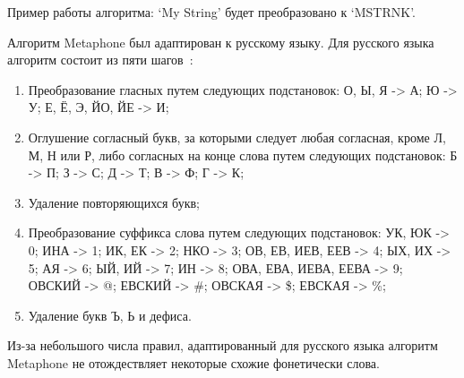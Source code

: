 Пример работы алгоритма: `My String' будет преобразовано к `MSTRNK'.

Алгоритм Metaphone был адаптирован к русскому языку. Для русского языка алгоритм состоит из пяти шагов~\cite{phonetic2}:

\begin{enumerate}
  \item Преобразование гласных путем следующих подстановок: О, Ы, Я -> А; Ю -> У; Е, Ё, Э, ЙО, ЙЕ -> И;
  \item Оглушение согласный букв, за которыми следует любая согласная, кроме Л, М, Н или Р, либо согласных на конце слова путем следующих подстановок: Б -> П; З -> С; Д -> Т; В -> Ф; Г -> К;
  \item Удаление повторяющихся букв;
  \item Преобразование суффикса слова путем следующих подстановок: УК, ЮК -> 0; ИНА -> 1; ИК, ЕК -> 2; НКО -> 3; ОВ, ЕВ, ИЕВ, ЕЕВ -> 4; ЫХ, ИХ -> 5; АЯ -> 6; ЫЙ, ИЙ -> 7; ИН -> 8; ОВА, ЕВА, ИЕВА, ЕЕВА -> 9; ОВСКИЙ -> @; ЕВСКИЙ -> \#; ОВСКАЯ -> \$; ЕВСКАЯ -> \%;
  \item Удаление букв Ъ, Ь и дефиса.
\end{enumerate}

Из-за небольшого числа правил, адаптированный для русского языка алгоритм Metaphone не отождествляет некоторые схожие фонетически слова.